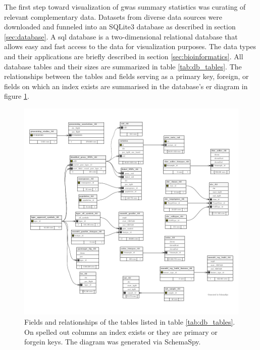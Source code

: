     The first step toward visualization of \ac{gwas} summary statistics was curating of relevant complementary data. Datasets from diverse data sources were downloaded and funneled into an SQLite3 database as described in section \ref{sec:database}. A \ac{sql} database is a two-dimensional relational database that allows easy and fast access to the data for visualization purposes. The data types and their applications are briefly described in section \ref{sec:bioinformatics}. All database tables and their sizes are summarized in table \ref{tab:db_tables}. The relationships between the tables and fields serving as a primary key, foreign, or fields on which an index exists are summarised in the database's \ac{er} diagram in figure \ref{fig:db_er}.

    \begin{figure}[h!]
    \capstart
        \centering
        \includegraphics{Abbildung/db-schema.pdf}

        \begin{minipage}{\captionwidth}
            \caption[database]{\newline
            Fields and relationships of the tables listed in table \ref{tab:db_tables}. On spelled out columns an index exists or they are primary or forgein keys. The diagram was generated via SchemaSpy.}
            \label{fig:db_er}
        \end{minipage}
    \end{figure}

